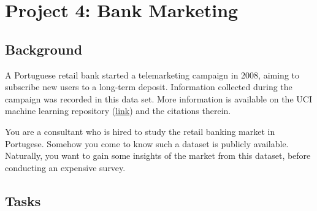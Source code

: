 \documentclass[12pt,]{book}
\begin{document}
\section{Project 4: Bank Marketing}\label{project-4-bank-marketing}

\subsection{Background}\label{background-3}

A Portuguese retail bank started a telemarketing campaign in 2008,
aiming to subscribe new users to a long-term deposit. Information
collected during the campaign was recorded in this data set. More
information is available on the UCI machine learning repository
(\href{https://archive.ics.uci.edu/ml/datasets/Bank+Marketing\#}{link})
and the citations therein.

You are a consultant who is hired to study the retail banking market in
Portugese. Somehow you come to know such a dataset is publicly
available. Naturally, you want to gain some insights of the market from
this dataset, before conducting an expensive survey.

\subsection{Tasks}\label{tasks-3}
\end{document}
